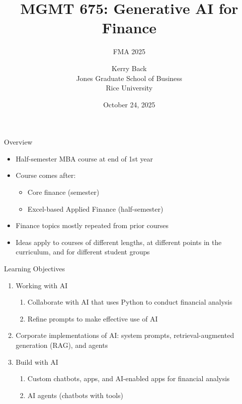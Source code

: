 \documentclass{beamer}
\title{MGMT 675: Generative AI for Finance}
\subtitle{FMA 2025}
\date{October 24, 2025}
\author{Kerry Back\\ 
Jones Graduate School of Business\\
Rice University}
\begin{document}
\maketitle


\begin{frame}{Overview}
    \begin{itemize}
    \item Half-semester MBA course at end of 1st year
    \item Course comes after: 
    \begin{itemize}
    \item Core finance (semester) 
    \item Excel-based Applied Finance (half-semester)
    \end{itemize}
    \item Finance topics mostly repeated from prior courses
    \item Ideas apply to courses of different lengths, at different points in the curriculum, and for different student groups
    \end{itemize}

\end{frame}

\begin{frame}{Learning Objectives}
\begin{enumerate}
    \item Working with AI
    \begin{enumerate}%
        \item Collaborate with AI that uses Python to conduct financial analysis 
        \item Refine prompts to make effective use of AI 
    \end{enumerate}
    \item Corporate implementations of AI: system prompts, retrieval-augmented generation (RAG), and agents
    \item Build with AI 
    \begin{enumerate}
        \item Custom chatbots, apps, and AI-enabled apps for financial analysis
        \item AI agents (chatbots with tools)
    \end{enumerate}
\end{enumerate}
\end{frame}
\end{document}
